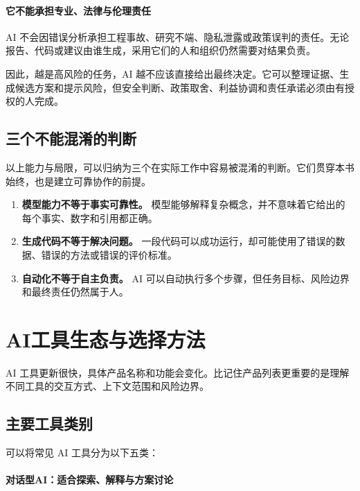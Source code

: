 \paragraph{它不能承担专业、法律与伦理责任}

AI 不会因错误分析承担工程事故、研究不端、隐私泄露或政策误判的责任。无论报告、代码或建议由谁生成，采用它们的人和组织仍然需要对结果负责。

因此，越是高风险的任务，AI 越不应该直接给出最终决定。它可以整理证据、生成候选方案和提示风险，但安全判断、政策取舍、利益协调和责任承诺必须由有授权的人完成。

\subsection{三个不能混淆的判断}

以上能力与局限，可以归纳为三个在实际工作中容易被混淆的判断。它们贯穿本书始终，也是建立可靠协作的前提。

\begin{enumerate}
  \item \textbf{模型能力不等于事实可靠性。} 模型能够解释复杂概念，并不意味着它给出的每个事实、数字和引用都正确。
  \item \textbf{生成代码不等于解决问题。} 一段代码可以成功运行，却可能使用了错误的数据、错误的方法或错误的评价标准。
  \item \textbf{自动化不等于自主负责。} AI 可以自动执行多个步骤，但任务目标、风险边界和最终责任仍然属于人。
\end{enumerate}

\section{AI工具生态与选择方法}

AI 工具更新很快，具体产品名称和功能会变化。比记住产品列表更重要的是理解不同工具的交互方式、上下文范围和风险边界。

\subsection{主要工具类别}

可以将常见 AI 工具分为以下五类：

\paragraph{对话型AI：适合探索、解释与方案讨论}

